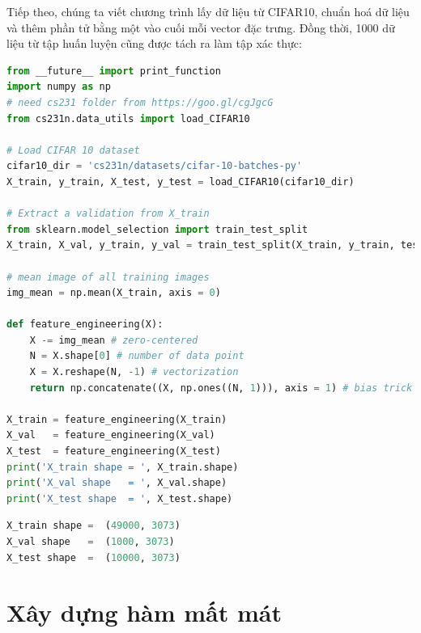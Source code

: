 Tiếp theo, chúng ta viết chương trình lấy dữ liệu từ CIFAR10, chuẩn hoá dữ
liệu và thêm phần tử bằng một vào cuối mỗi vector đặc trưng. Đồng thời, 1000 dữ liệu từ tập huấn luyện cũng được tách ra làm tập xác thực:

\begin{lstlisting}[language=Python]
from __future__ import print_function
import numpy as np
# need cs231 folder from https://goo.gl/cgJgcG
from cs231n.data_utils import load_CIFAR10

# Load CIFAR 10 dataset
cifar10_dir = 'cs231n/datasets/cifar-10-batches-py'
X_train, y_train, X_test, y_test = load_CIFAR10(cifar10_dir)

# Extract a validation from X_train
from sklearn.model_selection import train_test_split
X_train, X_val, y_train, y_val = train_test_split(X_train, y_train, test_size= 1000)

# mean image of all training images
img_mean = np.mean(X_train, axis = 0)

def feature_engineering(X):
    X -= img_mean # zero-centered
    N = X.shape[0] # number of data point
    X = X.reshape(N, -1) # vectorization
    return np.concatenate((X, np.ones((N, 1))), axis = 1) # bias trick

X_train = feature_engineering(X_train)
X_val   = feature_engineering(X_val)
X_test  = feature_engineering(X_test)
print('X_train shape = ', X_train.shape)
print('X_val shape   = ', X_val.shape)
print('X_test shape  = ', X_test.shape)
\end{lstlisting}

\kq
\begin{lstlisting}[language=Python]
X_train shape =  (49000, 3073)
X_val shape   =  (1000, 3073)
X_test shape  =  (10000, 3073)
\end{lstlisting}
\section{Xây dựng hàm mất mát }




